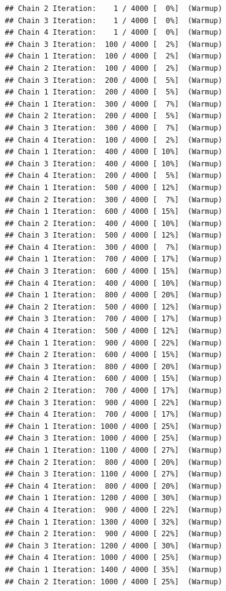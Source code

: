 \documentclass[
]{article}
\begin{document}
\begin{verbatim}
## Chain 2 Iteration:    1 / 4000 [  0%]  (Warmup) 
## Chain 3 Iteration:    1 / 4000 [  0%]  (Warmup) 
## Chain 4 Iteration:    1 / 4000 [  0%]  (Warmup) 
## Chain 3 Iteration:  100 / 4000 [  2%]  (Warmup) 
## Chain 1 Iteration:  100 / 4000 [  2%]  (Warmup) 
## Chain 2 Iteration:  100 / 4000 [  2%]  (Warmup) 
## Chain 3 Iteration:  200 / 4000 [  5%]  (Warmup) 
## Chain 1 Iteration:  200 / 4000 [  5%]  (Warmup) 
## Chain 1 Iteration:  300 / 4000 [  7%]  (Warmup) 
## Chain 2 Iteration:  200 / 4000 [  5%]  (Warmup) 
## Chain 3 Iteration:  300 / 4000 [  7%]  (Warmup) 
## Chain 4 Iteration:  100 / 4000 [  2%]  (Warmup) 
## Chain 1 Iteration:  400 / 4000 [ 10%]  (Warmup) 
## Chain 3 Iteration:  400 / 4000 [ 10%]  (Warmup) 
## Chain 4 Iteration:  200 / 4000 [  5%]  (Warmup) 
## Chain 1 Iteration:  500 / 4000 [ 12%]  (Warmup) 
## Chain 2 Iteration:  300 / 4000 [  7%]  (Warmup) 
## Chain 1 Iteration:  600 / 4000 [ 15%]  (Warmup) 
## Chain 2 Iteration:  400 / 4000 [ 10%]  (Warmup) 
## Chain 3 Iteration:  500 / 4000 [ 12%]  (Warmup) 
## Chain 4 Iteration:  300 / 4000 [  7%]  (Warmup) 
## Chain 1 Iteration:  700 / 4000 [ 17%]  (Warmup) 
## Chain 3 Iteration:  600 / 4000 [ 15%]  (Warmup) 
## Chain 4 Iteration:  400 / 4000 [ 10%]  (Warmup) 
## Chain 1 Iteration:  800 / 4000 [ 20%]  (Warmup) 
## Chain 2 Iteration:  500 / 4000 [ 12%]  (Warmup) 
## Chain 3 Iteration:  700 / 4000 [ 17%]  (Warmup) 
## Chain 4 Iteration:  500 / 4000 [ 12%]  (Warmup) 
## Chain 1 Iteration:  900 / 4000 [ 22%]  (Warmup) 
## Chain 2 Iteration:  600 / 4000 [ 15%]  (Warmup) 
## Chain 3 Iteration:  800 / 4000 [ 20%]  (Warmup) 
## Chain 4 Iteration:  600 / 4000 [ 15%]  (Warmup) 
## Chain 2 Iteration:  700 / 4000 [ 17%]  (Warmup) 
## Chain 3 Iteration:  900 / 4000 [ 22%]  (Warmup) 
## Chain 4 Iteration:  700 / 4000 [ 17%]  (Warmup) 
## Chain 1 Iteration: 1000 / 4000 [ 25%]  (Warmup) 
## Chain 3 Iteration: 1000 / 4000 [ 25%]  (Warmup) 
## Chain 1 Iteration: 1100 / 4000 [ 27%]  (Warmup) 
## Chain 2 Iteration:  800 / 4000 [ 20%]  (Warmup) 
## Chain 3 Iteration: 1100 / 4000 [ 27%]  (Warmup) 
## Chain 4 Iteration:  800 / 4000 [ 20%]  (Warmup) 
## Chain 1 Iteration: 1200 / 4000 [ 30%]  (Warmup) 
## Chain 4 Iteration:  900 / 4000 [ 22%]  (Warmup) 
## Chain 1 Iteration: 1300 / 4000 [ 32%]  (Warmup) 
## Chain 2 Iteration:  900 / 4000 [ 22%]  (Warmup) 
## Chain 3 Iteration: 1200 / 4000 [ 30%]  (Warmup) 
## Chain 4 Iteration: 1000 / 4000 [ 25%]  (Warmup) 
## Chain 1 Iteration: 1400 / 4000 [ 35%]  (Warmup) 
## Chain 2 Iteration: 1000 / 4000 [ 25%]  (Warmup) 

\end{verbatim}
\end{document}
